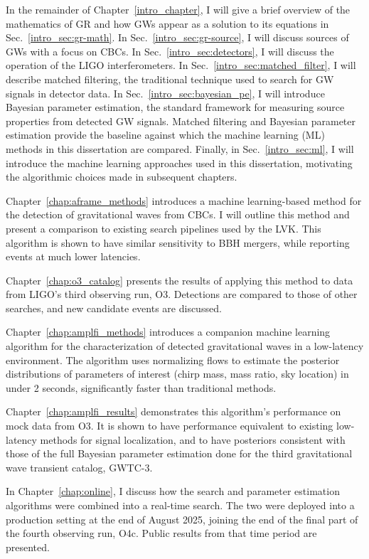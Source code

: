 \begin{refsection}
In the remainder of Chapter~\ref{intro_chapter}, I will give a brief overview of the mathematics of GR and how GWs appear as a solution to its equations in Sec.~\ref{intro_sec:gr-math}.
In Sec.~\ref{intro_sec:gr-source}, I will discuss sources of GWs with a focus on CBCs.
In Sec.~\ref{intro_sec:detectors}, I will discuss the operation of the LIGO interferometers.
In Sec.~\ref{intro_sec:matched_filter}, I will describe matched filtering, the traditional technique used to search for GW signals in detector data.
In Sec.~\ref{intro_sec:bayesian_pe}, I will introduce Bayesian parameter estimation, the standard framework for measuring source properties from detected GW signals.
Matched filtering and Bayesian parameter estimation provide the baseline against which the machine learning (ML) methods in this dissertation are compared.
Finally, in Sec.~\ref{intro_sec:ml}, I will introduce the machine learning approaches used in this dissertation, motivating the algorithmic choices made in subsequent chapters.

Chapter~\ref{chap:aframe_methods} introduces a machine learning-based method for the detection of gravitational waves from CBCs.
I will outline this method and present a comparison to existing search pipelines used by the LVK.
This algorithm is shown to have similar sensitivity to BBH mergers, while reporting events at much lower latencies.

Chapter~\ref{chap:o3_catalog} presents the results of applying this method to data from LIGO's third observing run, O3. 
Detections are compared to those of other searches, and new candidate events are discussed.

Chapter~\ref{chap:amplfi_methods} introduces a companion machine learning algorithm for the characterization of detected gravitational waves in a low-latency environment.
The algorithm uses normalizing flows to estimate the posterior distributions of parameters of interest (chirp mass, mass ratio, sky location) in under 2 seconds, significantly faster than traditional methods.

Chapter~\ref{chap:amplfi_results} demonstrates this algorithm's performance on mock data from O3.
It is shown to have performance equivalent to existing low-latency methods for signal localization, and to have posteriors consistent with those of the full Bayesian parameter estimation done for the third gravitational wave transient catalog, GWTC-3.

In Chapter~\ref{chap:online}, I discuss how the search and parameter estimation algorithms were combined into a real-time search.
The two were deployed into a production setting at the end of August 2025, joining the end of the final part of the fourth observing run, O4c.
Public results from that time period are presented.


\end{refsection}
